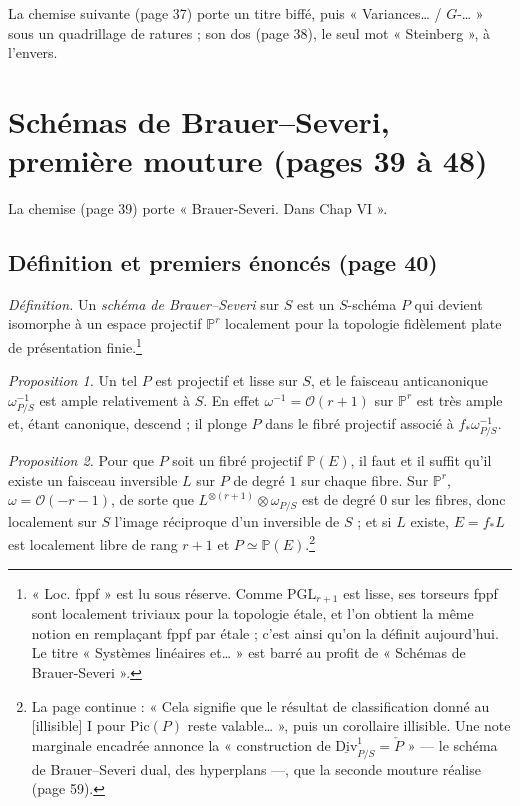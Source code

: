 \documentclass[11pt,a4paper]{article}
\begin{document}
La chemise suivante (page 37) porte un titre biffé, puis « Variances… /
$G$-… » sous un quadrillage de ratures ; son dos (page 38), le seul mot
« Steinberg », à l'envers.

\section*{Schémas de Brauer–Severi, première mouture (pages 39 à 48)}

La chemise (page 39) porte « Brauer-Severi. Dans Chap VI ».

\subsection*{Définition et premiers énoncés (page 40)}

\emph{Définition.} Un \emph{schéma de Brauer–Severi} sur $S$ est un $S$-schéma
$P$ qui devient isomorphe à un espace projectif $\mathbb{P}^{r}$ localement
pour la topologie fidèlement plate de présentation finie.\footnote{« Loc.
fppf » est lu sous réserve. Comme $\mathrm{PGL}_{r+1}$ est lisse, ses torseurs
fppf sont localement triviaux pour la topologie étale, et l'on obtient la même
notion en remplaçant fppf par étale ; c'est ainsi qu'on la définit
aujourd'hui. Le titre « Systèmes linéaires et… » est barré au profit de
« Schémas de Brauer-Severi ».}

\emph{Proposition 1.} Un tel $P$ est projectif et lisse sur $S$, et le faisceau
anticanonique $\omega_{P/S}^{-1}$ est ample relativement à $S$. En effet
$\omega^{-1} = \mathcal{O}(r+1)$ sur $\mathbb{P}^{r}$ est très ample et, étant
canonique, descend ; il plonge $P$ dans le fibré projectif associé à
$f_{*}\omega^{-1}_{P/S}$.

\emph{Proposition 2.} Pour que $P$ soit un fibré projectif $\mathbb{P}(E)$, il
faut et il suffit qu'il existe un faisceau inversible $L$ sur $P$ de degré $1$
sur chaque fibre. Sur $\mathbb{P}^{r}$, $\omega = \mathcal{O}(-r-1)$, de sorte
que $L^{\otimes(r+1)} \otimes \omega_{P/S}$ est de degré $0$ sur les fibres, donc
localement sur $S$ l'image réciproque d'un inversible de $S$ ; et si $L$
existe, $E = f_{*}L$ est localement libre de rang $r+1$ et $P \simeq
\mathbb{P}(E)$.\footnote{La page continue : « Cela signifie que le résultat
de classification donné au [illisible] I pour $\mathrm{Pic}(P)$ reste
valable… », puis un corollaire illisible. Une note marginale encadrée annonce
la « construction de $\underline{\mathrm{Div}}^{1}_{P/S} = \check{P}$ » — le
schéma de Brauer–Severi dual, des hyperplans —, que la seconde mouture
réalise (page 59).}
\end{document}
